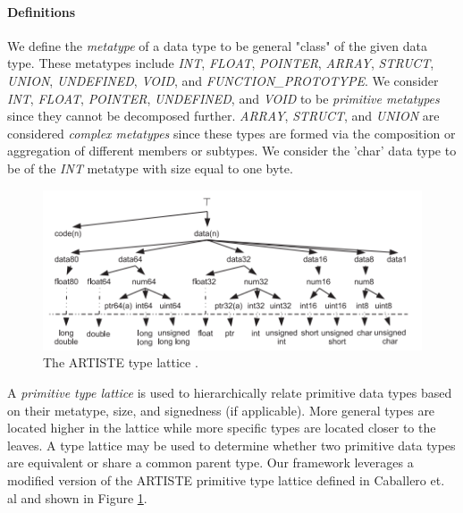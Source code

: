 \documentclass[a4paper,twoside]{article}
\begin{document}
\paragraph{Definitions}

We define the \emph{metatype} of a data type to be general "class" of the given data type. These metatypes include \emph{INT}, \emph{FLOAT}, \emph{POINTER}, \emph{ARRAY}, \emph{STRUCT}, \emph{UNION}, \emph{UNDEFINED}, \emph{VOID}, and \emph{FUNCTION\_PROTOTYPE}. We consider \emph{INT}, \emph{FLOAT}, \emph{POINTER}, \emph{UNDEFINED}, and \emph{VOID} to be \emph{primitive metatypes} since they cannot be decomposed further. \emph{ARRAY}, \emph{STRUCT}, and \emph{UNION} are considered \emph{complex metatypes} since these types are formed via the composition or aggregation of different members or subtypes. We consider the 'char' data type to be of the \emph{INT} metatype with size equal to one byte.

\begin{figure}[htb]
    \centering
    \includegraphics[width=\columnwidth]{./figures/ariste-type-lattice.png}
    \caption{The ARTISTE type lattice \cite{bib:artiste,bib:type-inference-executables}.}
    \label{fig:artiste-type-lattice}
\end{figure}

A \emph{primitive type lattice} \cite{bib:type-inference-executables} is used to hierarchically relate primitive data types based on their metatype, size, and signedness (if applicable). More general types are located higher in the lattice while more specific types are located closer to the leaves. A type lattice may be used to determine whether two primitive data types are equivalent or share a common parent type. Our framework leverages a modified version of the ARTISTE primitive type lattice defined in Caballero et. al \cite{bib:artiste} and shown in Figure \ref{fig:artiste-type-lattice}.

\end{document}
